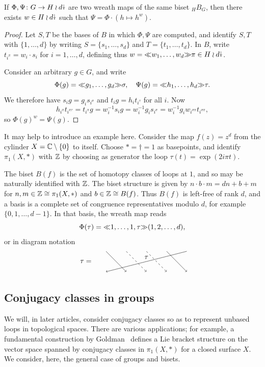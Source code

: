 \documentclass{amsart}
\begin{document}
\begin{lem}\label{lem:conjwr}
  If $\Phi,\Psi\colon G\to H\wr d{\stackrel{\downarrow}{\smash.}}$ are two wreath maps of the
  same biset ${}_H B_G$, then there exists $w\in H\wr d{\stackrel{\downarrow}{\smash.}}$ such that
  $\Psi=\Phi\cdot(h\mapsto h^w)$.
\end{lem}
\begin{proof}
  Let $S,T$ be the bases of $B$ in which $\Phi,\Psi$ are computed, and
  identify $S,T$ with $\{1,\dots,d\}$ by writing $S=\{s_1,\dots,s_d\}$
  and $T=\{t_1,\dots,t_d\}$. In $B$, write $t_{i^\pi}=w_i\cdot s_i$
  for $i=1,\dots,d$, defining thus $w={\ll}w_1,\dots,w_d{\gg}\pi\in H\wr
  d{\stackrel{\downarrow}{\smash.}}$.

  Consider an arbitrary $g\in G$, and write
  \[\Phi(g)={\ll}g_1,\dots,g_d{\gg}\sigma,\quad\Psi(g)={\ll}h_1,\dots,h_d{\gg}\tau.
  \]
  We therefore have $s_i g=g_is_{i^\sigma}$ and $t_i g=h_it_{i^\tau}$ for all $i$. Now
  \[h_{i^\pi}t_{i^{\pi\tau}}=t_{i^\pi}g=w_i^{-1}s_i g=w_i^{-1}g_is_{i^\sigma}=w_i^{-1}g_i w_{i^{\sigma\pi}}t_{i^{\sigma\pi}},\]
  so $\Phi(g)^w=\Psi(g)$.
\end{proof}

It may help to introduce an example here. Consider the map $f(z)=z^d$ from
the cylinder $X={\mathbb C}\setminus \{0\}$ to itself. Choose $*=\dagger=1$ as
basepoints, and identify $\pi_1(X,*)$ with ${\mathbb Z}$ by choosing as generator
the loop $\tau(t)=\exp(2i\pi t)$.

The biset $B(f)$ is the set of homotopy classes of loops at $1$, and so may
be naturally identified with ${\mathbb Z}$. The biset structure is given by $n\cdot
b\cdot m=d n+b+m$ for $n,m\in{\mathbb Z}\cong\pi_1(X,*)$ and $b\in{\mathbb Z}\cong B(f)$. Thus
$B(f)$ is left-free of rank $d$, and a basis is a complete set of
congruence representatives modulo $d$, for example $\{0,1,\dots,d-1\}$.  In
that basis, the wreath map reads
\[\Phi(\tau)={\ll}1,\dots,1,\tau{\gg}(1,2,\dots,d),\]
or in diagram notation
\[\begin{tikzpicture}
  \node at (-1,0.5) {$\tau=$};
  \draw[->] (0,1) -- (1,0);
  \draw[->,dashed] (1,1) -- (2,0);
  \draw[->,dashed] (2,1) -- (3,0);
  \draw[->] (3,1) -- (4,0);
  \draw[->] (4,1) -- node[above]{$\tau$} (0,0);
\end{tikzpicture}\]

\subsection{Conjugacy classes in groups}\label{ss:ccgroups}
We will, in later articles, consider conjugacy classes so as to represent
unbased loops in topological spaces. There are various applications; for
example, a fundamental construction by Goldman~\cite{goldman:pi1lie}
defines a Lie bracket structure on the vector space spanned by conjugacy
classes in $\pi_1(X,*)$ for a closed surface $X$. We consider, here, the
general case of groups and bisets.
\end{document}
